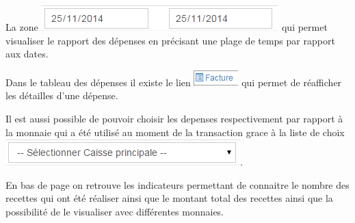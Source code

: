 \documentclass[12pt,a4paper]{report}
\begin{document}
La zone  \includegraphics[scale=0.7]{pic/PlageTimes.png} qui permet visualiser le rapport des dépenses en précisant une plage de temps par rapport aux dates.

Dans le tableau des dépenses il existe le lien \includegraphics[scale=0.7]{pic/FactureRePrint.png} qui permet de réafficher les détailles d'une dépense.

Il est aussi possible de pouvoir choisir les depenses respectivement par rapport à la monnaie qui a été utilisé au moment de la transaction grace à la liste de choix \includegraphics[scale=0.7]{pic/SelecPriCash.png}.

En bas de page on retrouve les indicateurs permettant de connaitre le nombre des recettes qui ont été réaliser ainsi que le montant total des recettes ainsi que la possibilité de le visualiser avec différentes monnaies. 


\tableofcontents
\end{document}
